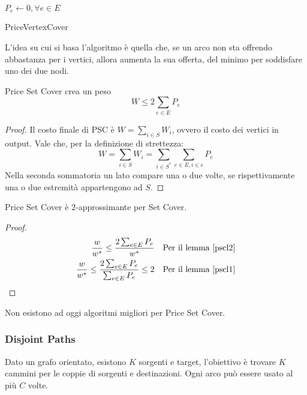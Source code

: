 \begin{algorithm}[H]
    \SetAlgoLined
     $P_e \gets 0, \forall e \in E$\\
     \caption{PriceVertexCover}
\end{algorithm}
L'idea su cui si basa l'algoritmo è quella che, se un arco non sta offrendo abbastanza per i vertici, allora 
aumenta la sua offerta, del minimo per soddisfare uno dei due nodi.
\begin{lemma}
    \label{pscl2}
    Price Set Cover crea un peso $$W \leq 2\sum_{e \in E}P_e$$
\end{lemma}
\begin{proof}
    Il costo finale di PSC è $W = \sum_{i \in S}W_i$, ovvero il costo 
    dei vertici in output. Vale che, per la definizione di strettezza:
    $$W = \sum_{i \in S}W_i = \sum_{i \in S^*} \sum_{e\in E, i \in e}P_e$$
    Nella seconda sommatoria un lato compare una o due volte, se rispettivamente 
    una o due estremità appartengono ad $S$.
\end{proof}
\begin{theorem}
    Price Set Cover è $2$-approssimante per Set Cover.
\end{theorem}
\begin{proof}
    \begin{equation}
        \begin{aligned}
            \frac{w}{w^*} \leq \frac{2\sum_{e \in E}P_e}{w^*} && \text{Per il lemma \ref{pscl2}}\\
            \frac{w}{w^*} \leq \frac{2\sum_{e \in E}P_e}{\sum_{e \in E} P_e } \leq 2 && \text{Per il lemma \ref{pscl1}}
        \end{aligned}
    \end{equation}
\end{proof}
\begin{remark}
    Non esistono ad oggi algoritmi migliori per Price Set Cover.
\end{remark}

\subsubsection{Disjoint Paths}
Dato un grafo orientato, esistono $K$ sorgenti e target, l'obiettivo è trovare $K$ cammini per le 
coppie di sorgenti e destinazioni. Ogni arco può essere usato al più $C$ volte.

